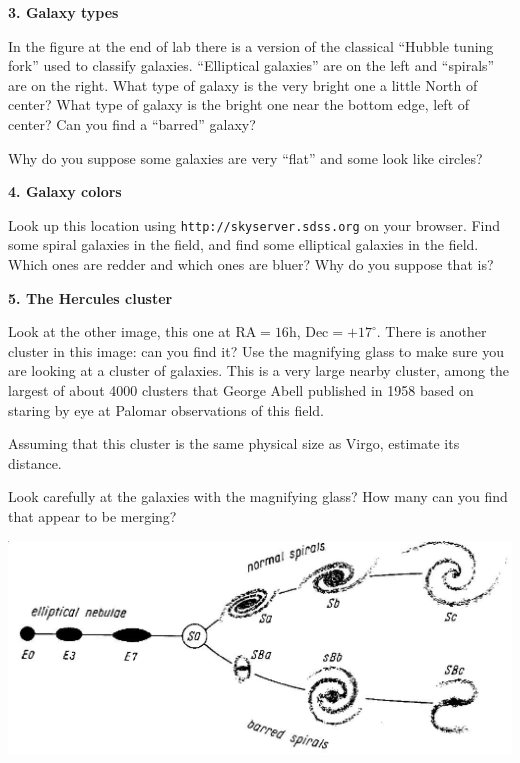 \clearpage

\noindent 
{\bf 3. Galaxy types}

\noindent In the figure at the end of lab there is a version of the
classical ``Hubble tuning fork'' used to classify galaxies.
``Elliptical galaxies'' are on the left and ``spirals'' are on the
right.  What type of galaxy is the very bright one a little North of
center? What type of galaxy is the bright one near the bottom edge,
left of center? Can you find a ``barred'' galaxy? 

\vspace{40pt}

\noindent Why do you suppose some galaxies are very ``flat'' and some
look like circles?

\vspace{40pt}

\noindent 
{\bf 4. Galaxy colors}

\noindent Look up this location using {\tt http://skyserver.sdss.org} on your
browser. Find some spiral galaxies in the field, and find some
elliptical galaxies in the field.  Which ones are redder and which
ones are bluer? Why do you suppose that is?

\vspace{40pt}

\noindent 
{\bf 5. The Hercules cluster}

\noindent Look at the other image, this one at RA$=16$h,
Dec$=+17^\circ$. There is another cluster in this image: can you find
it? Use the magnifying glass to make sure you are looking at a cluster
of galaxies. This is a very large nearby cluster, among the largest of
about 4000 clusters that George Abell published in 1958 based on
staring by eye at Palomar observations of this field. 

\noindent Assuming that this cluster is the same physical size as
Virgo, estimate its distance. 

\vspace{40pt}

\noindent Look carefully at the galaxies with the magnifying glass?
How many can you find that appear to be merging?

\vspace{40pt}

\clearpage

\includegraphics[width=5.5in]{tune.eps}
